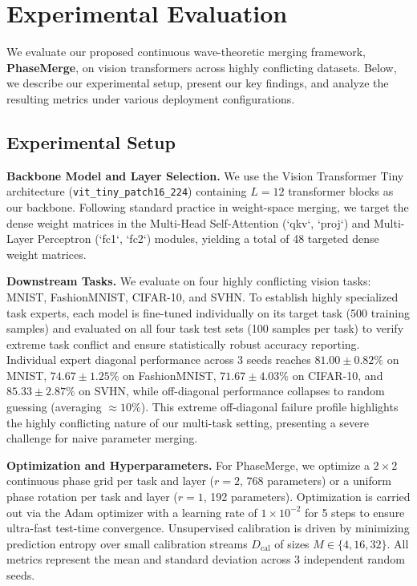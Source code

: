 \section{Experimental Evaluation}
\label{sec:experiments}

We evaluate our proposed continuous wave-theoretic merging framework, \textbf{PhaseMerge}, on vision transformers across highly conflicting datasets. Below, we describe our experimental setup, present our key findings, and analyze the resulting metrics under various deployment configurations.

\subsection{Experimental Setup}

\textbf{Backbone Model and Layer Selection.} We use the Vision Transformer Tiny architecture (\texttt{vit\_tiny\_patch16\_224}) \cite{dosovitskiy2020image} containing $L = 12$ transformer blocks as our backbone. Following standard practice in weight-space merging, we target the dense weight matrices in the Multi-Head Self-Attention (`qkv`, `proj`) and Multi-Layer Perceptron (`fc1`, `fc2`) modules, yielding a total of 48 targeted dense weight matrices.

\textbf{Downstream Tasks.} We evaluate on four highly conflicting vision tasks: MNIST, FashionMNIST, CIFAR-10, and SVHN. To establish highly specialized task experts, each model is fine-tuned individually on its target task (500 training samples) and evaluated on all four task test sets (100 samples per task) to verify extreme task conflict and ensure statistically robust accuracy reporting. Individual expert diagonal performance across 3 seeds reaches $81.00 \pm 0.82\%$ on MNIST, $74.67 \pm 1.25\%$ on FashionMNIST, $71.67 \pm 4.03\%$ on CIFAR-10, and $85.33 \pm 2.87\%$ on SVHN, while off-diagonal performance collapses to random guessing (averaging $\approx 10\%$). This extreme off-diagonal failure profile highlights the highly conflicting nature of our multi-task setting, presenting a severe challenge for naive parameter merging.

\textbf{Optimization and Hyperparameters.} For PhaseMerge, we optimize a $2 \times 2$ continuous phase grid per task and layer ($r = 2$, 768 parameters) or a uniform phase rotation per task and layer ($r = 1$, 192 parameters). Optimization is carried out via the Adam optimizer with a learning rate of $1\times 10^{-2}$ for 5 steps to ensure ultra-fast test-time convergence. Unsupervised calibration is driven by minimizing prediction entropy over small calibration streams $D_{\text{cal}}$ of sizes $M \in \{4, 16, 32\}$. All metrics represent the mean and standard deviation across 3 independent random seeds.

